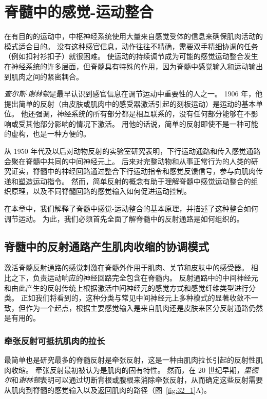\chapter{脊髓中的感觉-运动整合} \label{chap:chap32}

在有目的的运动中，中枢神经系统使用大量来自感觉受体的信息来确保肌肉活动的模式适合目的。
没有这种感官信息，动作往往不精确，需要双手精细协调的任务（例如扣衬衫扣子）就很困难。
使运动的持续调节成为可能的感觉运动整合发生在神经系统的许多层面，但脊髓具有特殊的作用，因为脊髓中感觉输入和运动输出到肌肉之间的紧密耦合。


\textit{查尔斯$\cdot$谢林顿}是最早认识到感官信息在调节运动中重要性的人之一。
1906 年，他提出简单的反射（由皮肤或肌肉中的感受器激活引起的刻板运动）是运动的基本单位。
他还强调，神经系统的所有部分都是相互联系的，没有任何部分能够在不影响或受其他部分影响的情况下激活。
用他的话说，简单的反射即使不是一种可能的虚构，也是一种方便的。


从 1950 年代及以后对动物反射的实验室研究表明，下行运动通路和传入感觉通路会聚在脊髓中共同的中间神经元上。
后来对完整动物和从事正常行为的人类的研究证实，脊髓中的神经回路通过整合下行运动指令和感觉反馈信号，参与向肌肉传递和塑造运动指令。
然而，简单反射的概念有助于理解脊髓中感觉运动整合的组织原理，以及不同脊髓回路的感觉输入如何促进运动控制。


在本章中，我们解释了脊髓中感觉-运动整合的基本原理，并描述了这种整合如何调节运动。
为此，我们必须首先全面了解脊髓中的反射通路是如何组织的。



\section{脊髓中的反射通路产生肌肉收缩的协调模式}

激活脊髓反射通路的感觉刺激在脊髓外作用于肌肉、关节和皮肤中的感受器。
相比之下，负责运动响应的神经回路完全包含在脊髓内。 
反射通路中的中间神经元和由此产生的反射传统上根据激活中间神经元的感觉方式和感觉纤维类型进行分类。
正如我们将看到的，这种分类与常见中间神经元上多种模式的显著收敛不一致，但作为一个起点，根据主要感觉输入是来自肌肉还是皮肤来区分反射通路仍然是有用的。



\subsection{牵张反射可抵抗肌肉的拉长}

最简单也是研究最多的脊髓反射是牵张反射，这是一种由肌肉拉长引起的反射性肌肉收缩。
牵张反射最初被认为是肌肉的固有特性。
然而，在 20 世纪早期，\textit{里德尔}和\textit{谢林顿}表明可以通过切断背根或腹根来消除牵张反射，从而确定这些反射需要从肌肉到脊髓的感觉输入以及返回肌肉的路径（图~\ref{fig:32_1}A)。


